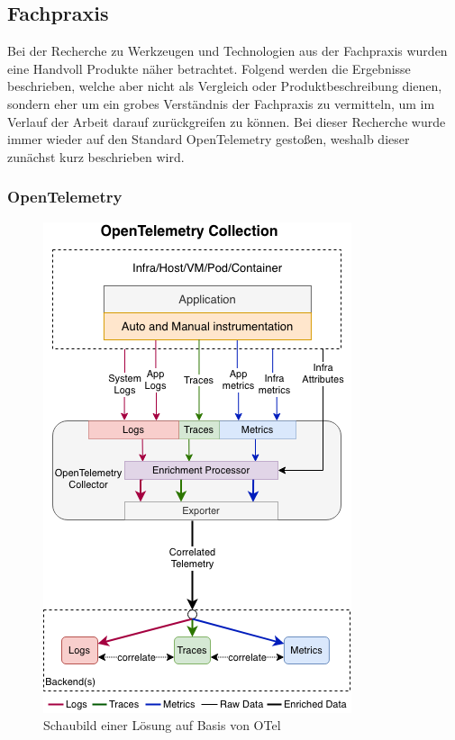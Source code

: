 \subsection{Fachpraxis}

Bei der Recherche zu Werkzeugen und Technologien aus der Fachpraxis wurden eine Handvoll Produkte näher betrachtet. Folgend werden die Ergebnisse beschrieben, welche aber nicht als Vergleich oder Produktbeschreibung dienen, sondern eher um ein grobes Verständnis der Fachpraxis zu vermitteln, um im Verlauf der Arbeit darauf zurückgreifen zu können. Bei dieser Recherche wurde immer wieder auf den Standard OpenTelemetry gestoßen, weshalb dieser zunächst kurz beschrieben wird.

\subsubsection{OpenTelemetry}

\begin{figure}
\centering
\vspace{-3\baselineskip}
\includegraphics[width=\linewidth]{img/03_methoden/otel_unified-collection_2.png}
\caption{Schaubild einer Lösung auf Basis von OTel \cite{OpenTelemetryUnifiedCollection}}
\label{fig:otel-unified-collection}
\end{figure}

